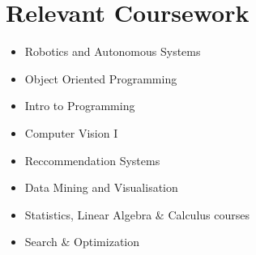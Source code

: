 \documentclass[letterpaper,11pt]{article}
\newcommand{\resumeSubHeadingListStart}{\begin{itemize}[leftmargin=0.0in, label={}]}
\newcommand{\resumeSubHeadingListEnd}{\end{itemize}}
\begin{document}
\section{Relevant Coursework}
        \begin{multicols}{2}
            \begin{itemize}[itemsep=-5pt, parsep=3pt]
                \item Robotics and Autonomous Systems
                \item Object Oriented Programming
                \item Intro to Programming
                \item Computer Vision I
                \item Reccommendation Systems
                \item Data Mining and Visualisation
                \item Statistics, Linear Algebra \& Calculus courses
                \item Search \& Optimization
            \end{itemize}
        \end{multicols}
        \vspace*{2.0\multicolsep}

    
\end{document}
